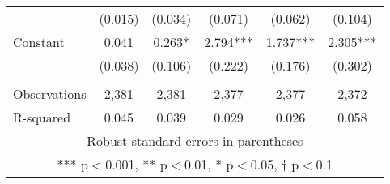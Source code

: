 \documentclass[]{article}
\begin{document}
\begin{tabular}{lccccc}
 & (0.015) & (0.034) & (0.071) & (0.062) & (0.104) \\
Constant & 0.041 & 0.263* & 2.794*** & 1.737*** & 2.305*** \\
 & (0.038) & (0.106) & (0.222) & (0.176) & (0.302) \\
 &  &  &  &  &  \\
Observations & 2,381 & 2,381 & 2,377 & 2,377 & 2,372 \\
 R-squared & 0.045 & 0.039 & 0.029 & 0.026 & 0.058 \\ \hline
\multicolumn{6}{c}{ Robust standard errors in parentheses} \\
\multicolumn{6}{c}{ *** p$<$0.001, ** p$<$0.01, * p$<$0.05, † p$<$0.1} \\
\end{tabular}
\end{document}
